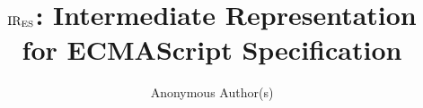 \documentclass[11pt,anonymous]{article}
\begin{document}


\title{\( \text{IR}_\text{ES} \): Intermediate Representation for ECMAScript Specification}

\author{Anonymous Author(s)}

\date{}
\maketitle



\end{document}
